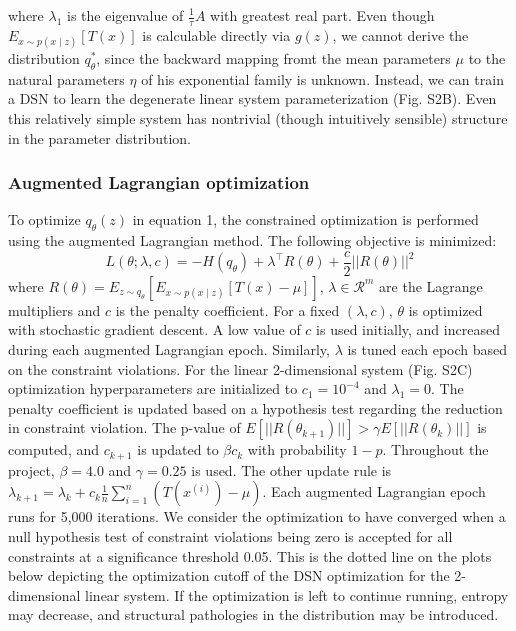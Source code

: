 \documentclass[11pt]{article}
\begin{document}
where $\lambda_1$ is the eigenvalue of $\frac{1}{\tau}A$ with greatest real part.
Even though $E_{x\sim p(x \mid z)}\left[T(x)\right]$ is calculable directly via $g(z)$, we cannot derive the distribution $q^*_\theta$, since the backward mapping fromt the mean parameters $\mu$ to the natural parameters $\eta$ of his exponential family is unknown.  Instead, we can train a DSN to learn the degenerate linear system parameterization (Fig. S2B). Even this relatively simple system has nontrivial (though intuitively sensible) structure in the parameter distribution.\\

\subsubsection{Augmented Lagrangian optimization}
To optimize $q_\theta(z)$ in equation 1, the constrained optimization is performed using the augmented Lagrangian method.  The following objective is minimized:
\begin{equation}
L(\theta; \lambda, c) = -H(q_\theta) + \lambda^\top R(\theta) + \frac{c}{2}||R(\theta)||^2
\end{equation}
where $R(\theta) = E_{z \sim q_\theta}\left[ E_{x\sim p(x \mid z)}\left[T(x) - \mu \right] \right]$, $\lambda \in \mathcal{R}^m$ are the Lagrange multipliers and $c$ is the penalty coefficient.  For a fixed $(\lambda, c)$, $\theta$ is optimized with stochastic gradient descent.  A low value of $c$ is used initially, and increased during each augmented Lagrangian epoch. Similarly, $\lambda$ is tuned each epoch based on the constraint violations.  For the linear 2-dimensional system (Fig. S2C) optimization hyperparameters are initialized to $c_1 = 10^{-4}$ and $\lambda_1 = 0$.  The penalty coefficient is updated based on a hypothesis test regarding the reduction in constraint violation.  The p-value of $E[||R(\theta_{k+1})||] > \gamma E[||R(\theta_{k})||]$ is computed, and $c_{k+1}$ is updated  to $\beta c_k$ with probability $1-p$.  Throughout the project, $\beta = 4.0$ and $\gamma = 0.25$ is used.  The other update rule is $\lambda_{k+1} = \lambda_k + c_k \frac{1}{n} \sum_{i=1}^n (T(x^{(i)}) - \mu)$.  Each augmented Lagrangian epoch runs for 5,000 iterations.  We consider the optimization to have converged when a null hypothesis test of constraint violations being zero is accepted for all constraints at a significance threshold 0.05.  This is the dotted line on the plots below depicting the optimization cutoff of the DSN optimization for the 2-dimensional linear system.  If the optimization is left to continue running, entropy may decrease, and structural pathologies in the distribution may be introduced.
\end{document}
